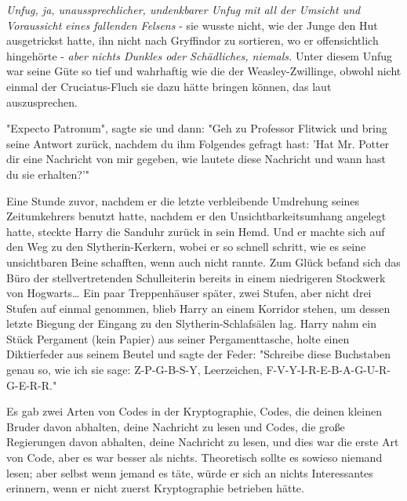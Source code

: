 {\emph{Unfug, ja, unaussprechlicher, undenkbarer Unfug mit all der Umsicht und Voraussicht eines fallenden Felsens} - sie wusste nicht, wie der Junge den Hut ausgetrickst hatte, ihn nicht nach Gryffindor zu sortieren, wo er offensichtlich hingehörte - \emph{aber nichts Dunkles oder Schädliches, niemals.} Unter diesem Unfug war seine Güte so tief und wahrhaftig wie die der Weasley-Zwillinge, obwohl nicht einmal der Cruciatus-Fluch sie dazu hätte bringen können, das laut auszusprechen.

"Expecto Patronum", sagte sie und dann: "Geh zu Professor Flitwick und bring seine Antwort zurück, nachdem du ihm Folgendes gefragt hast: 'Hat Mr. Potter dir eine Nachricht von mir gegeben, wie lautete diese Nachricht und wann hast du sie erhalten?'"

Eine Stunde zuvor, nachdem er die letzte verbleibende Umdrehung seines Zeitumkehrers benutzt hatte, nachdem er den Unsichtbarkeitsumhang angelegt hatte, steckte Harry die Sanduhr zurück in sein Hemd. Und er machte sich auf den Weg zu den Slytherin-Kerkern, wobei er so schnell schritt, wie es seine unsichtbaren Beine schafften, wenn auch nicht rannte. Zum Glück befand sich das Büro der stellvertretenden Schulleiterin bereits in einem niedrigeren Stockwerk von Hogwarts… Ein paar Treppenhäuser später, zwei Stufen, aber nicht drei Stufen auf einmal genommen, blieb Harry an einem Korridor stehen, um dessen letzte Biegung der Eingang zu den Slytherin-Schlafsälen lag. Harry nahm ein Stück Pergament (kein Papier) aus seiner Pergamenttasche, holte einen Diktierfeder aus seinem Beutel und sagte der Feder: "Schreibe diese Buchstaben genau so, wie ich sie sage: Z-P-G-B-S-Y, Leerzeichen, F-V-Y-I-R-E-B-A-G-U-R-G-E-R-R."

Es gab zwei Arten von Codes in der Kryptographie, Codes, die deinen kleinen Bruder davon abhalten, deine Nachricht zu lesen und Codes, die große Regierungen davon abhalten, deine Nachricht zu lesen, und dies war die erste Art von Code, aber es war besser als nichts. Theoretisch sollte es sowieso niemand lesen; aber selbst wenn jemand es täte, würde er sich an nichts Interessantes erinnern, wenn er nicht zuerst Kryptographie betrieben hätte.

}
